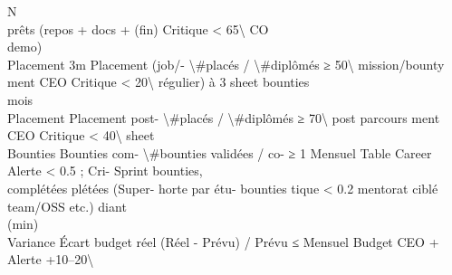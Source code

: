 \vspace{0.5em}
\vspace{0.5em}
\vspace{0.5em}
\vspace{0.5em}
N\\
prêts        (repos + docs +                                      (fin)                                 Critique \textless{} 65\textbackslash{}%
\vspace{0.5em}
\vspace{0.5em}
CO\\
demo)\\
Placement 3m Placement (job/-     \textbackslash{}#placés / \textbackslash{}#diplômés        ≥ 50\textbackslash{}%
mission/bounty                                                        ment       CEO      Critique \textless{} 20\textbackslash{}%
régulier) à 3                                                         sheet                                          bounties\\
mois\\
Placement    Placement post-      \textbackslash{}#placés / \textbackslash{}#diplômés        ≥ 70\textbackslash{}%
post         parcours                                                              ment       CEO      Critique \textless{} 40\textbackslash{}%
sheet\\
Bounties       Bounties com-      \textbackslash{}#bounties validées / co-   ≥ 1        Mensuel    Table      Career    Alerte \textless{} 0.5 ; Cri-       Sprint bounties,\\
complétées     plétées (Super-    horte                      par étu-              bounties             tique \textless{} 0.2               mentorat ciblé\\
team/OSS etc.)                                diant\\
(min)\\
Variance       Écart budget réel (Réel - Prévu) / Prévu      ≤     Mensuel         Budget     CEO +     Alerte +10–20\textbackslash{}%
